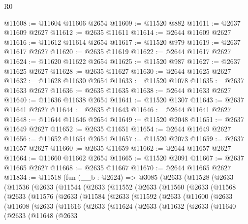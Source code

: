 \begin{lexlean}{R0}
\begin{coremodule}
@11608 := @11604 @11606 @2654
@11609 := @11520 @882
@11611 := @2637 @11609 @2627
@11612 := @2635 @11611
@11614 := @2644 @11609 @2627
@11616 := @11612 @11614 @2654
@11617 := @11520 @979
@11619 := @2637 @11617 @2627
@11620 := @2635 @11619
@11622 := @2644 @11617 @2627
@11624 := @11620 @11622 @2654
@11625 := @11520 @987
@11627 := @2637 @11625 @2627
@11628 := @2635 @11627
@11630 := @2644 @11625 @2627
@11632 := @11628 @11630 @2654
@11633 := @11520 @1078
@11635 := @2637 @11633 @2627
@11636 := @2635 @11635
@11638 := @2644 @11633 @2627
@11640 := @11636 @11638 @2654
@11641 := @11520 @1307
@11643 := @2637 @11641 @2627
@11644 := @2635 @11643
@11646 := @2644 @11641 @2627
@11648 := @11644 @11646 @2654
@11649 := @11520 @2048
@11651 := @2637 @11649 @2627
@11652 := @2635 @11651
@11654 := @2644 @11649 @2627
@11656 := @11652 @11654 @2654
@11657 := @11520 @2073
@11659 := @2637 @11657 @2627
@11660 := @2635 @11659
@11662 := @2644 @11657 @2627
@11664 := @11660 @11662 @2654
@11665 := @11520 @2091
@11667 := @2637 @11665 @2627
@11668 := @2635 @11667
@11670 := @2644 @11665 @2627
@11834 := @11518
    (fun (__b : @2624) =>
    @3085
      (@2633
        (@11528
          (@2633
            (@11536
              (@2633
                (@11544
                  (@2633
                    (@11552
                      (@2633
                        (@11560
                          (@2633
                            (@11568
                              (@2633
                                (@11576
                                  (@2633
                                    (@11584
                                      (@2633
                                        (@11592
                                          (@2633
                                            (@11600
                                              (@2633
                                                (@11608
                                                  (@2633
                                                    (@11616
                                                      (@2633
                                                        (@11624
                                                          (@2633
                                                            (@11632
                                                              (@2633
                                                                (@11640
                                                                  (@2633
                                                                    (@11648
                                                                      (@2633

\end{coremodule}
\end{lexlean}
